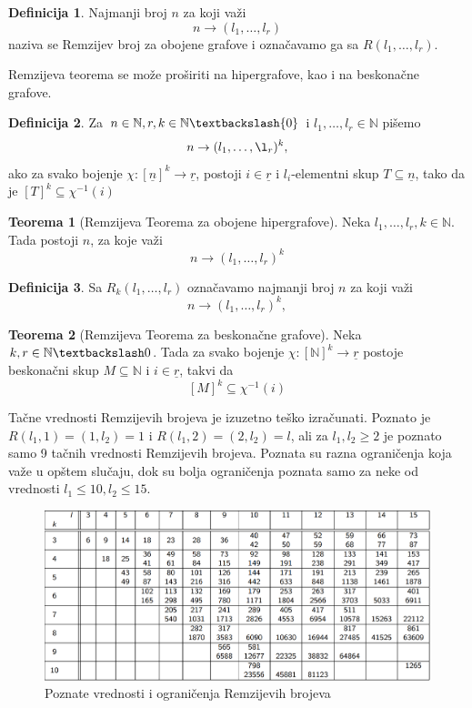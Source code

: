 \documentclass{article}
\theoremstyle{definition}
\newtheorem{definicija}{Definicija}[section]
\newtheorem{teorema}{Teorema}[section]
\begin{document}
	\begin{definicija}
		Najmanji broj $n$ za koji važi
		\[
		n\rightarrow(l_1,\ldots,l_r)
		\]
		naziva se Remzijev broj za obojene grafove i označavamo ga sa $R(l_1,\ldots,l_r)$.
	\end{definicija}

	Remzijeva teorema se može proširiti na hipergrafove, kao i na beskonačne grafove.
	
	\begin{definicija}
		Za $n \in \mathbb{N},r,k\in \mathbb{N}\textbackslash \{0\}$ i $l_1,\ldots,l_r \in \mathbb{N}$ pišemo
		\[
			n \rightarrow (l_1,\ldots,\l_r)^k,
		\]
		ako za svako bojenje $\chi:[\underline{n}]^k\rightarrow \underline{r}$, postoji $i \in \underline{r}$ i $l_i$-elementni skup $T\subseteq \underline{n}$, tako da je $[T]^k \subseteq \chi^{-1}(i)$
	\end{definicija}
	\begin{teorema}[Remzijeva Teorema za obojene hipergrafove]
		Neka $l_1,\ldots,l_r,k \in \mathbb{N}$. Tada postoji $n$, za koje važi
		\[
		n\rightarrow(l_1,\ldots,l_r)^k
		\]
	\end{teorema}
	
	\begin{definicija}
		Sa $R_k(l_1,\ldots,l_r)$ označavamo najmanji broj $n$ za koji važi
		\[
			n \rightarrow (l_1,\ldots,l_r)^k,
		\]
	\end{definicija}
	
	\begin{teorema}[Remzijeva Teorema za beskonačne grafove]
		Neka $k,r \in \mathbb{N}\textbackslash 0$.
		\noindent
		Tada za svako bojenje $\chi:[\mathbb{N}]^k\rightarrow \underline{r}$ postoje beskonačni skup $M\subseteq \mathbb{N}$ i $i\in \underline{r}$, takvi da 
		\[
			[M]^k\subseteq \chi^{-1}(i)
		\]
	\end{teorema}

	Tačne vrednosti Remzijevih brojeva je izuzetno teško izračunati. Poznato je $R(l_1,1)= (1,l_2) = 1$ i $R(l_1,2)= (2,l_2) = l$, ali za $l_1,l_2 \geq 2$ je poznato samo 9  tačnih vrednosti Remzijevih brojeva. Poznata su razna ograničenja koja važe u opštem slučaju, dok su bolja ograničenja poznata samo za neke od vrednosti $l_1\leq 10, l_2\leq 15$.
	
	\begin{figure}[h]
		\centering
		\includegraphics[width=\textwidth]{remziTabela}
		\caption{Poznate vrednosti i ograničenja Remzijevih brojeva\label{poznatiBrojevi}}
	\end{figure}
	
\end{document}
